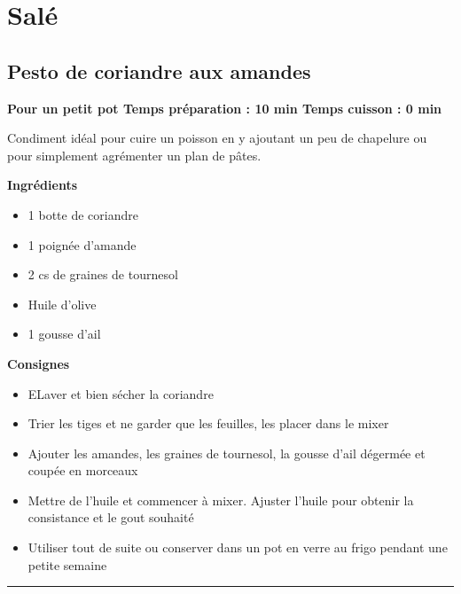 \documentclass[]{book}
\providecommand{\tightlist}{%
  \setlength{\itemsep}{0pt}\setlength{\parskip}{0pt}}
\begin{document}
\hypertarget{saluxe9-2}{%
\section*{Salé}\label{saluxe9-2}}

\hypertarget{pesto-de-coriandre-aux-amandes}{%
\subsection*{\texorpdfstring{{Pesto de coriandre aux amandes}}{Pesto de coriandre aux amandes}}\label{pesto-de-coriandre-aux-amandes}}

\begin{salebox}
\textbf{Pour un petit pot \textbar{} Temps préparation : 10 min
\textbar{} Temps cuisson : 0 min}

Condiment idéal pour cuire un poisson en y ajoutant un peu de chapelure
ou pour simplement agrémenter un plan de pâtes.
\end{salebox}

\textbf{Ingrédients}

\begin{itemize}
\tightlist
\item
  1 botte de coriandre
\item
  1 poignée d'amande
\item
  2 cs de graines de tournesol
\item
  Huile d'olive
\item
  1 gousse d'ail
\end{itemize}

\textbf{Consignes}

\begin{itemize}
\tightlist
\item
  ELaver et bien sécher la coriandre
\item
  Trier les tiges et ne garder que les feuilles, les placer dans le mixer
\item
  Ajouter les amandes, les graines de tournesol, la gousse d'ail dégermée et coupée en morceaux
\item
  Mettre de l'huile et commencer à mixer. Ajuster l'huile pour obtenir la consistance et le gout souhaité
\item
  Utiliser tout de suite ou conserver dans un pot en verre au frigo pendant une petite semaine
\end{itemize}

\begin{center}\rule{0.5\linewidth}{0.5pt}\end{center}
\end{document}
